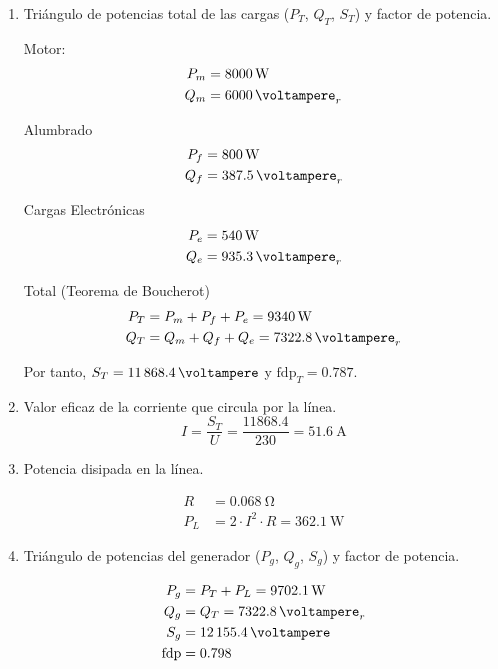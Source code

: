 \documentclass[10pt]{article}
\begin{document}
\begin{enumerate}
\item Triángulo de potencias total de las cargas ($P_T$, $Q_T$, $S_T$)
  y factor de potencia.

  Motor:
  \begin{align*}
    P_m &= \SI{8000}{\watt}\\
    Q_m &= \SI{6000}{\voltampere}_r\\
  \end{align*}

  Alumbrado
  \begin{align*}
    P_f &= \SI{800}{\watt}\\
    Q_f &= \SI{387.5}{\voltampere}_r\\
  \end{align*}

  Cargas Electrónicas
  \begin{align*}
    P_e &= \SI{540}{\watt}\\
    Q_e &= \SI{935.3}{\voltampere}_r\\
  \end{align*}

  Total (Teorema de Boucherot)
  \begin{align*}
    P_T &= P_m + P_f + P_e = \SI{9340}{\watt}\\
    Q_T &= Q_m + Q_f + Q_e = \SI{7322.8}{\voltampere}_r\\
  \end{align*}

  Por tanto, $S_T = \SI{11868.4}{\voltampere}$ y
  $\mathrm{fdp}_T = 0.787$.

\item Valor eficaz de la corriente que circula por la línea.
  \[
    I = \frac{S_T}{U} = \frac{11868.4}{230} = \SI{51.6}{\ampere}
  \]

\item Potencia disipada en la línea.

  \begin{align*}
    R &= \SI{0.068}{\ohm}\\
    P_L &= 2 \cdot I^2 \cdot R = \SI{362.1}{\watt}
  \end{align*}

\item Triángulo de potencias del generador ($P_g$, $Q_g$, $S_g$) y
  factor de potencia.


  \begin{align*}
    P_g &= P_T + P_L = \SI{9702.1}{\watt}\\
    Q_g &= Q_T = \SI{7322.8}{\voltampere}_r\\
    S_g &= \SI{12155.4}{\voltampere}\\    
    \mathrm{fdp} &= 0.798
  \end{align*}


\end{enumerate}
\end{document}
